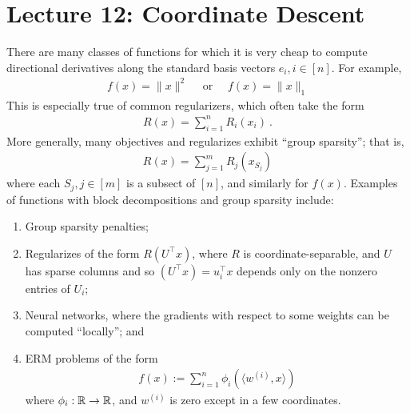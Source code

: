 \section{Lecture 12: Coordinate Descent}
There are many classes of functions for which it is very cheap 
to compute directional derivatives along the standard basis vectors
$e_i, i \in [n]$.
%
For example, 
%
\begin{eqnarray}
f(x) = \|x\|^2\quad \text{ or }\quad f(x) = \|x\|_1
\end{eqnarray}
%
This is especially true of common regularizers, 
%
which often take the form 
\begin{eqnarray}
R(x) = \sum_{i=1}^n R_i(x_i) \ .
\end{eqnarray}
%
More generally, many objectives and regularizes exhibit ``group sparsity''; that is,
%
\begin{eqnarray}
R(x) =  \sum_{j=1}^m R_{j}(x_{S_j})
\end{eqnarray}
where each $S_j, j \in [m]$ is a subsect of $[n]$, and similarly for $f(x)$.
%
Examples of functions with block decompositions and group sparsity include:
\begin{enumerate} 
	\item Group sparsity penalties;
	\item Regularizes of the form $R(U^\top x)$, where $R$ is
    coordinate-separable, and $U$ has sparse columns and so
    $(U^\top x) = u_i^\top x$ depends only on the nonzero entries of $U_i$;
	\item Neural networks, where the gradients with respect to some weights can be
    computed ``locally''; and
	\item ERM problems of the form 
    \begin{eqnarray}
    f(x) := \sum_{i=1}^n \phi_i(\langle w^{(i)} , x \rangle )
    \end{eqnarray}
    where $\phi_i: \mathbb{R} \to \mathbb{R}$, and $w^{(i)}$ is zero except in a few coordinates. 
\end{enumerate} 

